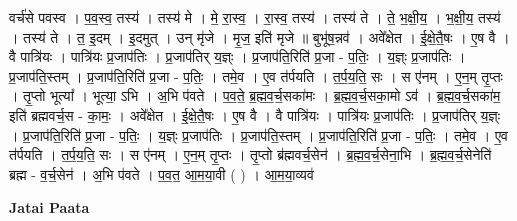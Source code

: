 \documentclass[17pt]{extarticle}
\begin{document}
वर्च॑से पवस्व । प॒व॒स्व॒ तस्य॑ । तस्य॑ मे । मे॒ रा॒स्व॒ । रा॒स्व॒ तस्य॑ । तस्य॑ ते । ते॒ भ॒क्षी॒य॒ । भ॒क्षी॒य॒ तस्य॑ । तस्य॑ ते । त॒ इ॒दम् । इ॒दमुत् । उन् मृ॑जे । मृ॒ज॒ इति॑ मृजे ॥ बुभू॑ष॒न्नव॑ । अवे᳚क्षेत । ई॒क्षे॒तै॒षः । ए॒ष वै । वै पात्रि॑यः । पात्रि॑यः प्र॒जाप॑तिः । प्र॒जाप॑तिर् य॒ज्ञ्ः । प्र॒जाप॑ति॒रिति॑ प्र॒जा - प॒तिः॒ । य॒ज्ञ्ः प्र॒जाप॑तिः । प्र॒जाप॑ति॒स्तम् । प्र॒जाप॑ति॒रिति॑ प्र॒जा - प॒तिः॒ । तमे॒व । ए॒व त॑र्पयति । त॒र्प॒य॒ति॒ सः । स ए॑नम् । ए॒न॒म् तृ॒प्तः । तृ॒प्तो भूत्या᳚ । भूत्या॒ ऽभि । अ॒भि प॑वते । प॒व॒ते॒ ब्र॒ह्म॒व॒र्च॒सका॑मः । ब्र॒ह्म॒व॒र्च॒सका॒मो ऽव॑ । ब्र॒ह्म॒व॒र्च॒सका॑म॒ इति॑ ब्रह्मवर्च॒स - का॒मः॒ । अवे᳚क्षेत । ई॒क्षे॒तै॒षः । ए॒ष वै । वै पात्रि॑यः । पात्रि॑यः प्र॒जाप॑तिः । प्र॒जाप॑तिर् य॒ज्ञ्ः । प्र॒जाप॑ति॒रिति॑ प्र॒जा - प॒तिः॒ । य॒ज्ञ्ः प्र॒जाप॑तिः । प्र॒जाप॑ति॒स्तम् । प्र॒जाप॑ति॒रिति॑ प्र॒जा - प॒तिः॒ । तमे॒व । ए॒व त॑र्पयति । त॒र्प॒य॒ति॒ सः । स ए॑नम् । ए॒न॒म् तृ॒प्तः । तृ॒प्तो ब्र॑ह्मवर्च॒सेन॑ । ब्र॒ह्म॒व॒र्च॒सेना॒भि । ब्र॒ह्म॒व॒र्च॒सेनेति॑ ब्रह्म - व॒र्च॒सेन॑ । अ॒भि प॑वते । प॒व॒त॒ आ॒म॒या॒वी ( ) । आ॒म॒या॒व्यव॑ \newline

\textbf{Jatai Paata} \newline
\end{document}
